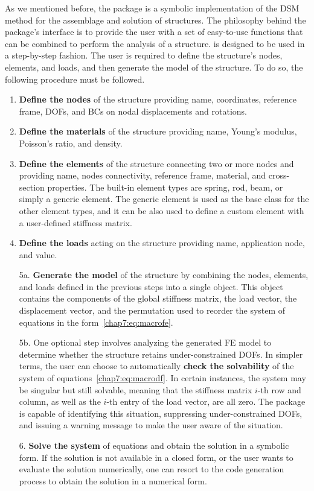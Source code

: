 As we mentioned before, the \TrussMe{} package is a symbolic implementation of the \ac{DSM} method for the assemblage and solution of structures. The philosophy behind the package's interface is to provide the user with a set of easy-to-use functions that can be combined to perform the analysis of a structure. \TrussMe{} is designed to be used in a step-by-step fashion. The user is required to define the structure's nodes, elements, and loads, and then generate the model of the structure. To do so, the following procedure must be followed.
%
\begin{enumerate}
  \item \textbf{Define the nodes} of the structure providing name, coordinates, reference frame, \acp{DOF}, and \acp{BC} on nodal displacements and rotations.
  \item \textbf{Define the materials} of the structure providing name, Young's modulus, Poisson's ratio, and density.
  \item \textbf{Define the elements} of the structure connecting two or more nodes and providing name, nodes connectivity, reference frame, material, and cross-section properties. The built-in element types are spring, rod, beam, or simply a generic element. The generic element is used as the base class for the other element types, and it can be also used to define a custom element with a user-defined stiffness matrix.
  \item \textbf{Define the loads} acting on the structure providing name, application node, and value.
  \item[5a.] \textbf{Generate the model} of the structure by combining the nodes, elements, and loads defined in the previous steps into a single object. This object contains the components of the global stiffness matrix, the load vector, the displacement vector, and the permutation used to reorder the system of equations in the form~\eqref{chap7:eq:macrofe}.
  \item[5b.] One optional step involves analyzing the generated \ac{FE} model to determine whether the structure retains under-constrained \acp{DOF}. In simpler terms, the user can choose to automatically \textbf{check the solvability} of the system of equations~\eqref{chap7:eq:macrodf}. In certain instances, the system may be singular but still solvable, meaning that the stiffness matrix $i$-th row and column, as well as the $i$-th entry of the load vector, are all zero. The \TrussMe{} package is capable of identifying this situation, suppressing under-constrained \acp{DOF}, and issuing a warning message to make the user aware of the situation.
  \item[6.] \textbf{Solve the system} of equations and obtain the solution in a symbolic form. If the solution is not available in a closed form, or the user wants to evaluate the solution numerically, one can resort to the code generation process to obtain the solution in a numerical form.
\end{enumerate}

